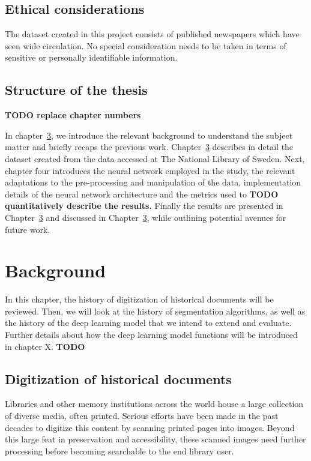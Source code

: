 \documentclass[english, bibtex]{kththesis}
\begin{document}
\section{Ethical considerations}

The dataset created in this project consists of published newspapers which have seen wide circulation. No special consideration needs to be taken in terms of sensitive or personally identifiable information.   

\section{Structure of the thesis}

\textbf{TODO replace chapter numbers} 

In chapter~\ref{ch:background}, we introduce the relevant background to understand the subject matter and briefly recaps the previous work. Chapter~\ref{ch:background} describes in detail the dataset created from the data accessed at The National Library of Sweden. Next, chapter four introduces the neural network employed in the study, the relevant adaptations to the pre-processing and manipulation of the data, implementation details of the neural network architecture and the metrics used to \textbf{TODO quantitatively describe the results.} Finally the results are presented in Chapter~\ref{ch:background} and discussed in Chapter~\ref{ch:background}, while outlining potential avenues for future work.

\cleardoublepage
\chapter{Background}
\label{ch:background}

In this chapter, the history of digitization of historical documents will be reviewed. Then, we will look at the history of segmentation algorithms, as well as the history of the deep learning model that we intend to extend and evaluate. Further details about how the deep learning model functions will be introduced in chapter X. \textbf{TODO}

\section{Digitization of historical documents}

Libraries and other memory institutions across the world house a large collection of diverse media, often printed. Serious efforts have been made in the past decades to digitize this content by scanning printed pages into images. Beyond this large feat in preservation and accessibility, these scanned images need further processing before becoming searchable to the end library user. 
\end{document}
